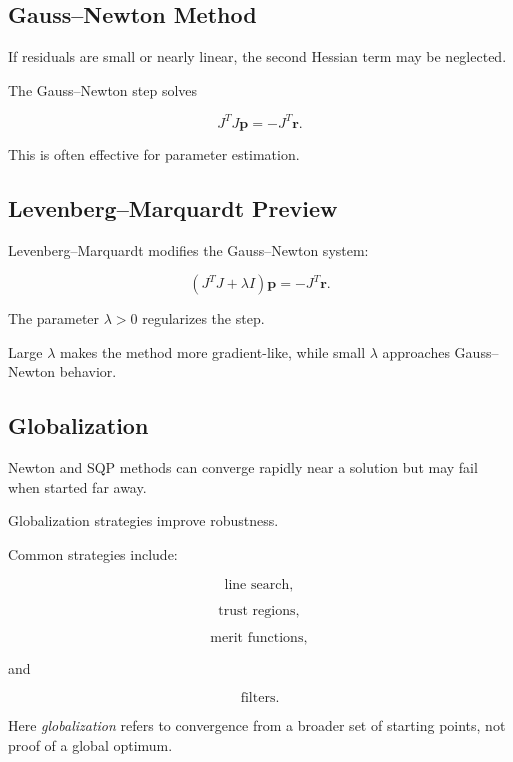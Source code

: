\subsection{Gauss--Newton Method}
\label{subsec:gauss-newton-method}

If residuals are small or nearly linear, the second Hessian term may be
neglected.

The Gauss--Newton step solves

\[
\boxed{
J^TJ\mathbf{p}
=
-
J^T\mathbf{r}.
}
\]

This is often effective for parameter estimation.

\subsection{Levenberg--Marquardt Preview}
\label{subsec:levenberg-marquardt}

Levenberg--Marquardt modifies the Gauss--Newton system:

\[
\boxed{
(
J^TJ+\lambda I
)
\mathbf{p}
=
-
J^T\mathbf{r}.
}
\]

The parameter \(\lambda>0\) regularizes the step.

Large \(\lambda\) makes the method more gradient-like, while small
\(\lambda\) approaches Gauss--Newton behavior.

\subsection{Globalization}
\label{subsec:nlp-globalization}

Newton and SQP methods can converge rapidly near a solution but may fail
when started far away.

Globalization strategies improve robustness.

Common strategies include:

\[
\boxed{
\text{line search},
}
\]

\[
\boxed{
\text{trust regions},
}
\]

\[
\boxed{
\text{merit functions},
}
\]

and

\[
\boxed{
\text{filters}.
}
\]

Here \emph{globalization} refers to convergence from a broader set of
starting points, not proof of a global optimum.

